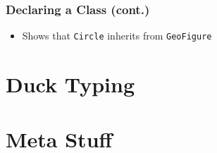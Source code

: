 \documentclass{beamer}
\begin{document}
\begin{frame}[t,fragile]
  \frametitle{Declaring a Class (cont.)}
  \begin{example}
    \begin{semiverbatim}
    \end{semiverbatim}
  \end{example}

  \begin{itemize}
    \item<2> Shows that \texttt{Circle} inherits from \texttt{GeoFigure}
  \end{itemize}
\end{frame}

\section{Duck Typing}
\begin{frame}
\end{frame}

\section{Meta Stuff}
\begin{frame}
\end{frame}
\end{document}
